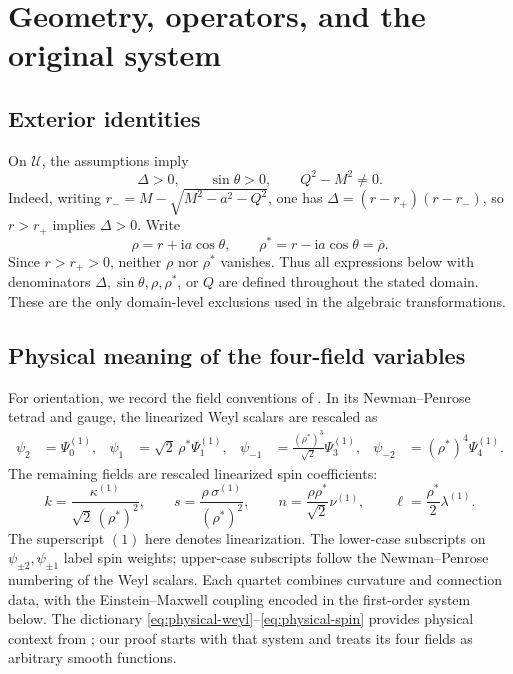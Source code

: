 \documentclass[11pt,a4paper]{article}
\numberwithin{equation}{section}
\theoremstyle{definition}
\theoremstyle{remark}
\newcommand{\I}{\mathrm i}
\newcommand{\Uext}{\mathcal U}
\begin{document}
\section{Geometry, operators, and the original system}
\label{sec:original}

\subsection{Exterior identities}

On \(\Uext\), the assumptions imply
\begin{equation}
 \Delta>0,\qquad \sin\theta>0,\qquad Q^2-M^2\neq0.
\label{eq:positivity}
\end{equation}
Indeed, writing \(r_-=M-\sqrt{M^2-a^2-Q^2}\), one has
\(\Delta=(r-r_+)(r-r_-)\), so \(r>r_+\) implies \(\Delta>0\).
Write
\begin{equation}
 \rho=r+\I a\cos\theta,\qquad
 \rho^*=r-\I a\cos\theta=\overline{\rho}.
\label{eq:rho}
\end{equation}
Since \(r>r_+>0\), neither \(\rho\) nor \(\rho^*\) vanishes.  Thus all
expressions below with denominators \(\Delta,\sin\theta,\rho,\rho^*\), or
\(Q\) are defined throughout the stated domain.  These are the only
domain-level exclusions used in the algebraic transformations.

\subsection{Physical meaning of the four-field variables}
\label{sec:physical-fields}

For orientation, we record the field conventions of
\cite{Hintz2026}.  In its Newman--Penrose tetrad and gauge, the
linearized Weyl scalars are rescaled as
\begin{align}
 \psi_2&=\Psi_0^{(1)},&
 \psi_1&=\sqrt2\,\rho^*\Psi_1^{(1)},&
 \psi_{-1}&=\frac{(\rho^*)^3}{\sqrt2}\Psi_3^{(1)},&
 \psi_{-2}&=(\rho^*)^4\Psi_4^{(1)}.
 \label{eq:physical-weyl}
\end{align}
The remaining fields are rescaled linearized spin coefficients:
\begin{equation}
 k=\frac{\kappa^{(1)}}{\sqrt2\,(\rho^*)^2},\qquad
 s=\frac{\rho\,\sigma^{(1)}}{(\rho^*)^2},\qquad
 n=\frac{\rho\rho^*}{\sqrt2}\nu^{(1)},\qquad
 \ell=\frac{\rho^*}{2}\lambda^{(1)}.
 \label{eq:physical-spin}
\end{equation}
The superscript \((1)\) here denotes linearization.  The lower-case
subscripts on \(\psi_{\pm2},\psi_{\pm1}\) label spin weights; upper-case
subscripts follow the Newman--Penrose numbering of the Weyl scalars.
Each quartet combines curvature and connection data, with the
Einstein--Maxwell coupling encoded in the first-order system below.
The dictionary \eqref{eq:physical-weyl}--\eqref{eq:physical-spin}
provides physical context from \cite{Hintz2026}; our proof starts with
that system and treats its four fields as arbitrary smooth functions.
\end{document}
